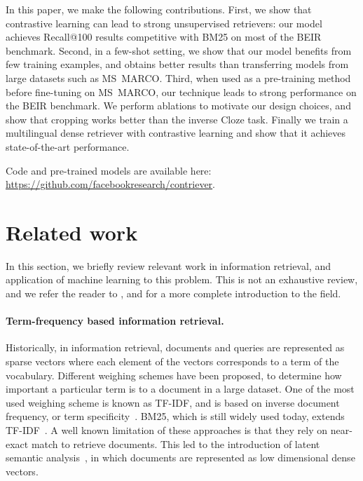 \documentclass[10pt]{article} %
\begin{document}
In this paper, we make the following contributions.
First, we show that contrastive learning can lead to strong unsupervised retrievers: our model achieves Recall@100 results competitive with BM25 on most of the BEIR benchmark.
Second, in a few-shot setting, we show that our model benefits from few training examples, and obtains better results than transferring models from large datasets such as MS~MARCO.
Third, when used as a pre-training method before fine-tuning on MS~MARCO, our technique leads to strong performance on the BEIR benchmark.
We perform ablations to motivate our design choices, and show that cropping works better than the inverse Cloze task.
Finally we train a multilingual dense retriever with contrastive learning and show that it achieves state-of-the-art performance.

Code and pre-trained models are available here: \url{https://github.com/facebookresearch/contriever}.

\section{Related work}
In this section, we briefly review relevant work in information retrieval, and application of machine learning to this problem.
This is not an exhaustive review, and we refer the reader to \citet{manning2008introduction}, \citet{mitra2018introduction} and \citet{lin2020pretrained} for a more complete introduction to the field.

\paragraph{Term-frequency based information retrieval.}
Historically, in information retrieval, documents and queries are represented as sparse vectors where each element of the vectors corresponds to a term of the vocabulary.
Different weighing schemes have been proposed, to determine how important a particular term is to a document in a large dataset.
One of the most used weighing scheme is known as TF-IDF, and is based on inverse document frequency, or term specificity~\citep{jones1972statistical}.
BM25, which is still widely used today, extends TF-IDF~\citep{robertson1995okapi}.
A well known limitation of these approaches is that they rely on near-exact match to retrieve documents.
This led to the introduction of latent semantic analysis~\citep{deerwester1990indexing}, in which documents are represented as low dimensional dense vectors.
\end{document}
